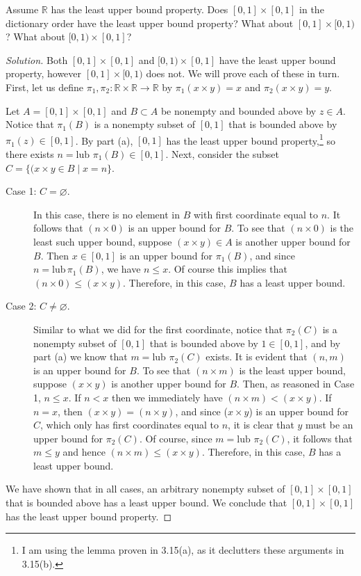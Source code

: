 \documentclass[11pt]{article}
\newenvironment{ex}[2][Exercise]{
  \begin{trivlist}
    \item[\hskip \labelsep {\bfseries #1}\hskip \labelsep {\bfseries #2.}]}
  {\end{trivlist}}
\newenvironment{solution}{\begin{proof}[Solution]}{\end{proof}}
\begin{document}
\begin{ex}{3.15 (b)}
  Assume $\mathbb{R}$ has the least upper bound property. Does $[0, 1] \times [0, 1]$ in the dictionary order have the least upper bound property? What about $[0, 1] \times [0, 1)$? What about $[0,1) \times [0, 1]$?
\end{ex}

\begin{solution}
  Both $[0, 1] \times [0, 1]$ and $[0,1) \times [0, 1]$ have the least upper bound
  property, however $[0, 1] \times [0, 1)$ does not. We will prove each of these in turn.
  First, let us define
  \mbox{$\pi_1, \pi_2 : \mathbb{R} \times \mathbb{R} \to \mathbb{R}$}
  by $\pi_1(x \times y) = x$ and $\pi_2(x \times y) = y.$

  Let $A = [0, 1] \times [0, 1]$ and $B \subset A$ be nonempty and bounded above by $z \in
  A$. Notice that $\pi_1(B)$ is a nonempty subset of $[0,1]$ that is bounded above by
  $\pi_1(z) \in [0, 1]$. By part (a), $[0,1]$ has the least upper bound
  property,\footnote{I am using the lemma proven in 3.15(a), as it declutters these
  arguments in 3.15(b).}
  so there exists $n
  = \text{lub } \pi_1(B) \in [0, 1]$. Next, consider the subset $C = \{
  (x \times y \in B \mid x = n\}$.
  \begin{description}
    \item[Case 1: $C = \varnothing$.]
      In this case, there is no element in $B$ with first coordinate equal to $n$. It
      follows that $(n \times 0)$ is an upper bound for $B$. To see that $(n \times 0)$ is
      the least such upper bound, suppose $(x \times y) \in A$ is another upper bound for $B$.
      Then $x \in [0, 1]$ is an upper bound for $\pi_1(B)$, and
      since $n = \text{lub}\, \pi_1(B)$, we have $n \leq x$. Of course this implies
      that $(n \times 0) \leq (x \times y)$. Therefore, in this case, $B$ has a least
      upper bound.
    \item[Case 2: $C \ne \varnothing$.]
      Similar to what we did for the first coordinate, notice that $\pi_2(C)$ is a nonempty
      subset of $[0, 1]$ that is bounded above by $1 \in [0, 1]$, and by part (a) we know
      that $m = \text{lub } \pi_2(C)$ exists. It is evident that $(n, m)$ is an upper
      bound for $B$. To see that $(n \times m)$ is the least upper bound, suppose $(x \times
      y)$ is another upper bound for $B$. Then, as reasoned in Case 1, $n \leq x$. If $n
      < x$ then we immediately have $(n \times m) < (x \times y)$. If $n = x$, then $(x
      \times y) = (n \times y)$, and since ($x \times y$) is an upper bound for $C$, which
      only has first coordinates equal to $n$, it is clear that
      $y$ must be an upper bound for $\pi_2(C)$. Of course, since $m = \text{lub
      }\pi_2(C)$, it follows that $m \le y$
      and hence $(n \times m) \le (x \times y)$. Therefore, in this case, $B$ has a least
      upper bound.
  \end{description}
  We have shown that in all cases, an arbitrary nonempty subset of $[0, 1] \times [0,
  1]$ that is bounded above has a least upper bound. We conclude that $[0, 1] \times [0,
  1]$ has the least upper bound property.


\end{solution}
\end{document}
